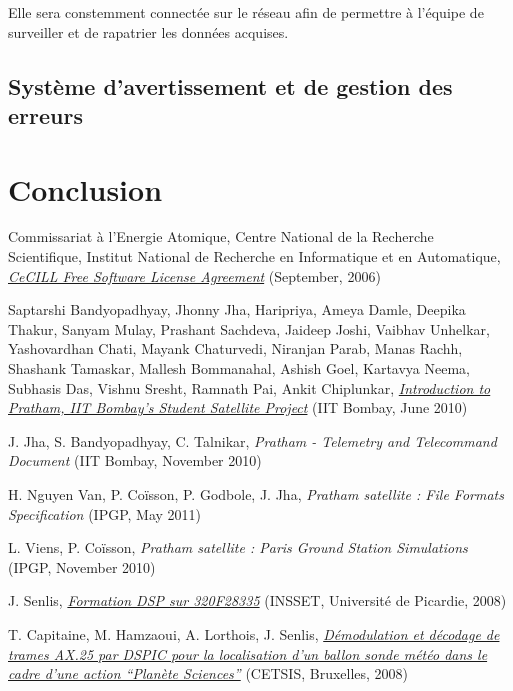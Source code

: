 \documentclass[twocolumn,pre,floats,aps,amsmath,amssymb]{revtex4}
\begin{document}
Elle sera constemment connect\'ee sur le r\'eseau afin de permettre \`a l'\'equipe de surveiller et de rapatrier les donn\'ees acquises.

\subsection{Syst\`eme d'avertissement et de gestion des erreurs}

\section{Conclusion}
\label{sec:conclusion}

\begin{thebibliography}{99}

Commissariat à l'Energie Atomique, Centre National de la Recherche Scientifique, Institut National de Recherche en Informatique et en Automatique, {\it \href{http://www.cecill.info/licences/Licence_CeCILL_V2-en.html}{CeCILL Free Software License Agreement}} (September, 2006)

Saptarshi Bandyopadhyay, Jhonny Jha, Haripriya, Ameya Damle, Deepika Thakur, Sanyam Mulay, Prashant Sachdeva, Jaideep Joshi, Vaibhav Unhelkar, Yashovardhan Chati, Mayank Chaturvedi, Niranjan Parab, Manas Rachh, Shashank Tamaskar, Mallesh Bommanahal, Ashish Goel, Kartavya Neema, Subhasis Das, Vishnu Sresht, Ramnath Pai, Ankit Chiplunkar, {\it \href{http://www.aero.iitb.ac.in/pratham/otherdocs/IIT-B_Paper_Pratham_20thApr.pdf}{Introduction to Pratham, IIT Bombay’s Student Satellite Project}} (IIT Bombay, June 2010)

J. Jha, S. Bandyopadhyay, C. Talnikar, {\it Pratham - Telemetry and Telecommand Document} (IIT Bombay, November 2010)

H. Nguyen Van, P. Co\"isson, P. Godbole, J. Jha, {\it Pratham satellite : File Formats Specification} (IPGP, May 2011)

L. Viens, P. Co\"isson, {\it Pratham satellite : Paris Ground Station Simulations} (IPGP, November 2010)

J. Senlis, {\it \href{http://jgsenlis.free.fr/dsp_28335.htm}{Formation DSP sur 320F28335}} (INSSET, Universit\'e de Picardie, 2008)

T. Capitaine, M. Hamzaoui, A. Lorthois, J. Senlis, {\it \href{http://jgsenlis.free.fr/ax25/Cetsis2008_AX25.pdf}{D\'emodulation et d\'ecodage de trames AX.25 par DSPIC pour la localisation d'un ballon sonde m\'et\'eo dans le cadre d'une action ``Plan\`ete Sciences''}} (CETSIS, Bruxelles, 2008)


\end{thebibliography}
\end{document}

